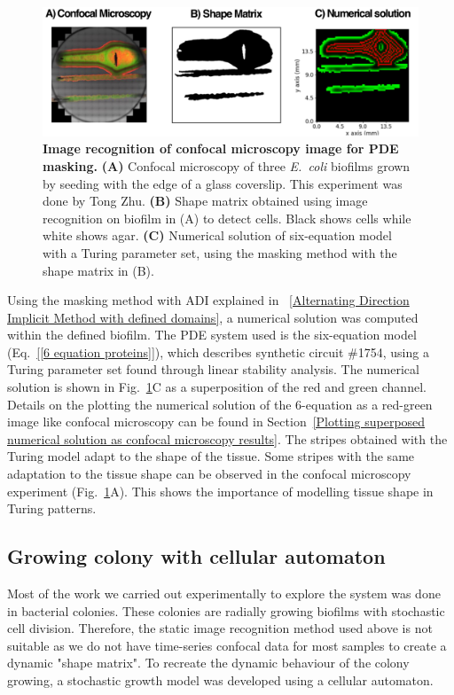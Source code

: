 \begin{figure}[H]
    \centering

    \includegraphics[width=1\textwidth]{chapters/Chapter 3/shmoo}
    \caption{\textbf{Image recognition of confocal microscopy image for PDE masking.} \textbf{(A)} Confocal microscopy of three \textit{E.~coli} biofilms grown by seeding with the edge of a glass coverslip. This experiment was done by Tong Zhu. \textbf{(B)} Shape matrix obtained using image recognition on biofilm in (A) to detect cells. Black shows cells while white shows agar. \textbf{(C)} Numerical solution of six-equation model with a Turing parameter set, using the masking method with the shape matrix in (B).}
    \label{shmoo}
\end{figure}
Using the masking method with ADI explained in ~\ref{Alternating Direction Implicit Method with defined domains}, a numerical solution was computed within the defined biofilm.
The PDE system used is the six-equation model (Eq.~\ref{[6 equation proteins]}), which describes synthetic circuit \#1754, using a Turing parameter set found through linear stability analysis.
The numerical solution is shown in Fig.~\ref{shmoo}C as a superposition of the red and green channel.
Details on the plotting the numerical solution of the 6-equation as a red-green image like confocal microscopy can be found in Section~\ref{Plotting superposed numerical solution as confocal microscopy results}.
The stripes obtained with the Turing model adapt to the shape of the tissue.
Some stripes with the same adaptation to the tissue shape can be observed in the confocal microscopy experiment (Fig.~\ref{shmoo}A).
This shows the importance of modelling tissue shape in Turing patterns.

\subsection{Growing colony with cellular automaton}
Most of the work we carried out experimentally to explore the system was done in bacterial colonies.
These colonies are radially growing biofilms with stochastic cell division.
Therefore, the static image recognition method used above is not suitable as we do not have time-series confocal data for most samples to create a dynamic "shape matrix".
To recreate the dynamic behaviour of the colony growing, a stochastic growth model was developed using a cellular automaton.

